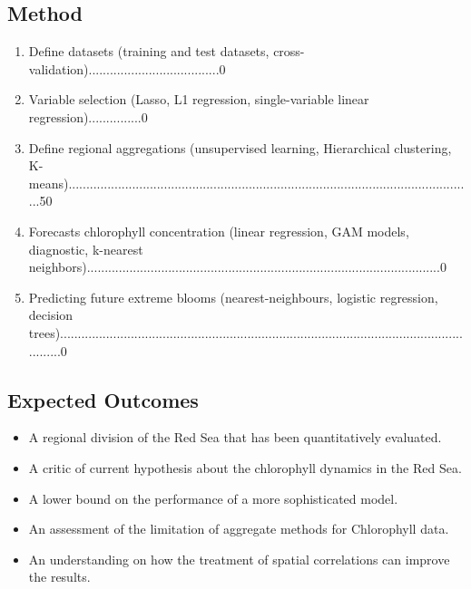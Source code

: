\subsection{Method}

\begin{enumerate}
\item Define datasets (training and test datasets, cross-validation).....................................0%
\item Variable selection (Lasso, L1 regression, single-variable linear regression)...............0%
\item Define regional aggregations (unsupervised learning, Hierarchical clustering, K-means)...................................................................................................................50%
\item Forecasts chlorophyll concentration (linear regression, GAM models, diagnostic, k-nearest neighbors)....................................................................................................0%
\item Predicting future extreme blooms (nearest-neighbours, logistic regression, decision trees)...........................................................................................................................0%
\end{enumerate}

\subsection{Expected Outcomes}

\begin{itemize}
\item A regional division of the Red Sea that has been quantitatively evaluated.
\item A critic of current hypothesis about the chlorophyll dynamics in the Red Sea.
\item A lower bound on the performance of a more sophisticated model.
\item An assessment of the limitation of aggregate methods for Chlorophyll data.
\item An understanding on how the treatment of spatial correlations can improve the results.
\end{itemize}


